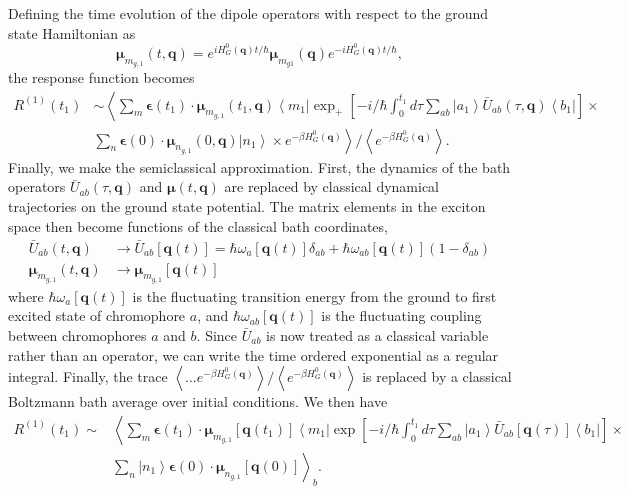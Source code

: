 \documentclass{article}
\newcommand{\bra}[1]{\ensuremath{\left\langle#1\right|}}
\newcommand{\ket}[1]{\ensuremath{\left|#1\right\rangle}}
\newcommand{\ensb}[1]{\left\langle#1\right\rangle}
\newcommand{\vect}[1]{\ensuremath{\boldsymbol{\mathbf{#1}}}}
\begin{document}
Defining the time evolution of the dipole operators with respect to the ground state Hamiltonian as
\begin{equation}
\vect \mu_{m_{g,1}}(t,\vect q)=
e^{iH_{G}^{0}(\vect q)t/\hbar}\vect\mu_{m_{g1}}(\vect q)e^{-iH_{G}^0(\vect q)t/\hbar},
\end{equation}
the response function becomes
\begin{equation}
\begin{split}
R^{(1)}(t_{1})&\sim
\left\langle\sum_{m}\vect\epsilon(t_{1})\cdot \vect \mu_{m_{g,1}}(t_{1},\vect q) \bra{m_{1}}
\exp_{+}\left[-i/\hbar\int_0^{t_1}d\tau\sum_{ab}\ket{a_{1}}\bar U_{ab}(\tau,\vect q) \bra{b_{1}}\right]\times\right.\\
&\sum_{n}\vect\epsilon(0)\cdot\vect \mu_{n_{g,1}}(0,\vect q)\ket{n_{1}}\times
\left. e^{-\beta H_{G}^{0}(\vect{q})}\right\rangle/\ensb{e^{-\beta H_{G}^{0}(\vect{q})}}.
\end{split}
\end{equation}
Finally, we make the semiclassical approximation. 
First, the dynamics of the bath operators $\bar U_{ab}(\tau,\vect q)$ and $\vect \mu(t,\vect q)$ are replaced by classical dynamical trajectories on the ground state potential.
The matrix elements in the exciton space then become functions of the classical bath coordinates, 
\begin{equation}
\begin{split}
\bar U_{ab}(t,\vect q)&\rightarrow \bar U_{ab}[\vect q(t)]=\hbar\omega_{a}[\vect q(t)]\delta_{ab} + \hbar\omega_{ab}[\vect q(t)](1-\delta_{ab})\\
\vect\mu_{m_{g,1}}(t,\vect q)&\rightarrow \vect\mu_{m_{g,1}}[\vect q(t)]
\end{split}
\end{equation}
where $\hbar \omega_{a}[\vect q(t)]$ is the fluctuating transition energy from the ground to first excited state of chromophore $a$, and $\hbar\omega_{ab}[\vect q(t)]$ is the fluctuating coupling between chromophores $a$ and $b$. 
Since $\bar U_{ab}$ is now treated as a classical variable rather than an operator, we can write the time ordered exponential as a regular integral.
Finally, the trace $\ensb{\ldots e^{-\beta H_{G}^{0}(\vect q)}}/\ensb{e^{-\beta H_{G}^{0}(\vect q)}}$ is replaced by a classical Boltzmann bath average over initial conditions.
We then have
\begin{equation}
\begin{split}
R^{(1)}(t_{1})\sim
&\left\langle\sum_{m}\vect\epsilon(t_{1})\cdot \vect\mu_{m_{g,1}}[\vect q(t_{1})] \bra{m_{1}}
\exp\left[-i/\hbar\int_0^{t_1}d\tau\sum_{ab}\ket{a_{1}}\bar U_{ab}[\vect q(\tau)] \bra{b_{1}}\right]\times\right.\\
&\left. \sum_{n}\ket{n_{1}}\vect\epsilon(0)\cdot\vect\mu_{n_{g,1}}[\vect q(0)] \right\rangle_{b}.
\end{split}
\end{equation}
\end{document}
